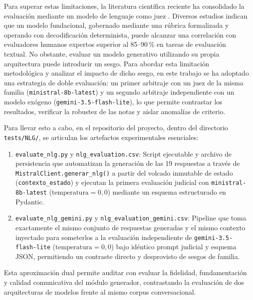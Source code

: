 \documentclass[12pt,a4paper]{report}
\begin{document}
Para superar estas limitaciones, la literatura científica reciente ha consolidado la evaluación mediante un modelo de lenguaje como juez \cite{zheng2023judging, kim2024prometheus}. Diversos estudios indican que un modelo fundacional, gobernado mediante una rúbrica formalizada y operando con decodificación determinista, puede alcanzar una correlación con evaluadores humanos expertos superior al 85--90\,\% en tareas de evaluación textual. No obstante, evaluar un modelo generativo utilizando su propia arquitectura puede introducir un sesgo. Para abordar esta limitación metodológica y analizar el impacto de dicho sesgo, en este trabajo se ha adoptado una estrategia de doble evaluación: un primer arbitraje con un juez de la misma familia (\texttt{ministral-8b-latest}) y un segundo arbitraje independiente con un modelo exógeno (\texttt{gemini-3.5-flash-lite}), lo que permite contrastar los resultados, verificar la robustez de las notas y aislar anomalías de criterio.

Para llevar esto a cabo, en el repositorio del proyecto, dentro del directorio \texttt{tests/NLG/}, se articulan los artefactos experimentales esenciales:
\begin{enumerate}
    \item \texttt{evaluate\_nlg.py} y \texttt{nlg\_evaluation.csv}: Script ejecutable y archivo de persistencia que automatizan la generación de las 19 respuestas a través de \texttt{MistralClient.generar\_nlg()} a partir del volcado inmutable de estado (\texttt{contexto\_estado}) y ejecutan la primera evaluación judicial con \texttt{ministral-8b-latest} ($\text{temperatura} = 0{,}0$) mediante un esquema estructurado en Pydantic.
    \item \texttt{evaluate\_nlg\_gemini.py} y \texttt{nlg\_evaluation\_gemini.csv}: Pipeline que toma exactamente el mismo conjunto de respuestas generadas y el mismo contexto inyectado para someterlos a la evaluación independiente de \texttt{gemini-3.5-flash-lite} ($\text{temperatura} = 0{,}0$) bajo idéntico prompt judicial y esquema JSON, permitiendo un contraste directo y desprovisto de sesgos de familia.
\end{enumerate}

Esta aproximación dual permite auditar con evaluar la fidelidad, fundamentación y calidad comunicativa del módulo generador, contrastando la evaluación de dos arquitecturas de modelos frente al mismo corpus conversacional.
\end{document}
